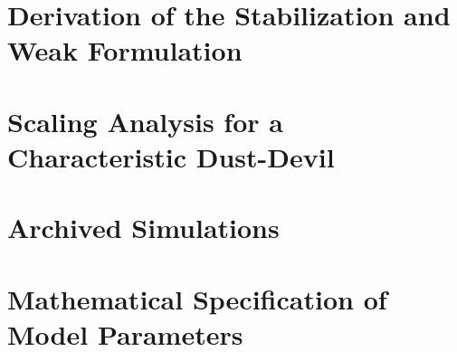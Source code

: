 \documentclass[final,letterpaper,12pt]{report}    %
\theoremstyle{definition}
\theoremstyle{remark}
\begin{document}
%

\appendices

\chapter{Derivation of the Stabilization and Weak Formulation}


\chapter{Scaling Analysis for a Characteristic Dust-Devil}


\chapter{Archived Simulations}


\chapter{Mathematical Specification of Model Parameters}

\end{document}
